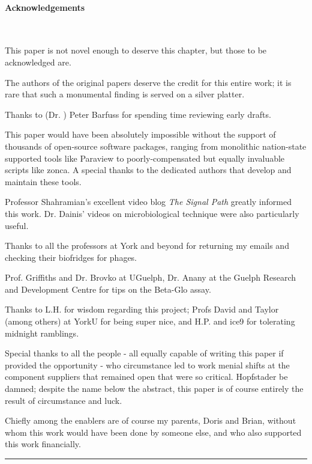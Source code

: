 \documentclass[paper.tex]{subfiles}
\begin{document}
	
\clearpage
\paragraph{Acknowledgements}\

This paper is not novel enough to deserve this chapter, but those to be acknowledged are.

The authors of the original papers deserve the credit for this entire work; it is rare that such a monumental finding is served on a silver platter.

Thanks to (Dr. ) Peter Barfuss for spending time reviewing early drafts.

This paper would have been absolutely impossible without the support of thousands of open-source software packages, ranging from monolithic nation-state supported tools like Paraview to poorly-compensated but equally invaluable scripts like zonca. A special thanks to the dedicated authors that develop and maintain these tools.

Professor Shahramian's excellent video blog {\it The Signal Path} greatly informed this work. Dr. Dainis' videos on microbiological technique were also particularly useful.

Thanks to all the professors at York and beyond for returning my emails and checking their biofridges for phages.

Prof. Griffiths and Dr. Brovko at UGuelph, Dr. Anany at the Guelph Research and Development Centre for tips on the Beta-Glo assay.

Thanks to L.H. for wisdom regarding this project; Profs David and Taylor (among others) at YorkU for being super nice, and H.P. and ice9 for tolerating midnight ramblings.

Special thanks to all the people - all equally capable of writing this paper if provided the opportunity - who circumstance led to work menial shifts at the component suppliers that remained open that were so critical. Hopfstader be damned; despite the name below the abstract, this paper is of course entirely the result of circumstance and luck. 



Chiefly among the enablers are of course my parents, Doris and Brian, without whom this work would have been done by someone else, and who also supported this work financially. 



\rule{\linewidth}{0.2pt}
\end{document}
